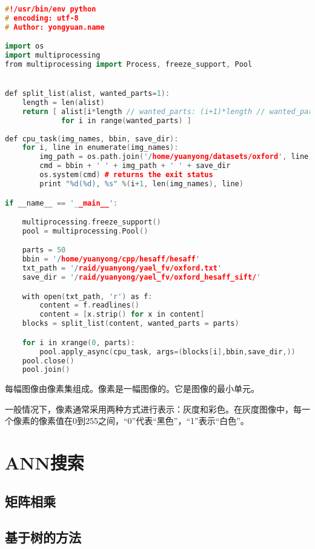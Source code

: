 \documentclass[color=cyan,mathpazo,titlestyle=hang]{elegantbook}
\begin{document}
\begin{lstlisting}[language=c++]
#!/usr/bin/env python
# encoding: utf-8
# Author: yongyuan.name

import os
import multiprocessing
from multiprocessing import Process, freeze_support, Pool


def split_list(alist, wanted_parts=1):
    length = len(alist)
    return [ alist[i*length // wanted_parts: (i+1)*length // wanted_parts]
             for i in range(wanted_parts) ]
             
def cpu_task(img_names, bbin, save_dir):
    for i, line in enumerate(img_names):
        img_path = os.path.join('/home/yuanyong/datasets/oxford', line)
        cmd = bbin + ' ' + img_path + ' ' + save_dir
        os.system(cmd) # returns the exit status
        print "%d(%d), %s" %(i+1, len(img_names), line)

if __name__ == '__main__':

    multiprocessing.freeze_support()
    pool = multiprocessing.Pool()

    parts = 50
    bbin = '/home/yuanyong/cpp/hesaff/hesaff'
    txt_path = '/raid/yuanyong/yael_fv/oxford.txt'
    save_dir = '/raid/yuanyong/yael_fv/oxford_hesaff_sift/'

    with open(txt_path, 'r') as f:
        content = f.readlines()
        content = [x.strip() for x in content]
    blocks = split_list(content, wanted_parts = parts)

    for i in xrange(0, parts):
        pool.apply_async(cpu_task, args=(blocks[i],bbin,save_dir,))
    pool.close()
    pool.join()
\end{lstlisting}

每幅图像由像素集组成。像素是一幅图像的{\color{red}{原材料，积木}}。它是图像的最小单元。

一般情况下，像素通常采用两种方式进行表示：灰度和彩色。在灰度图像中，每一个像素的像素值在0到255之间，“0”代表“黑色”，“1”表示“白色”。

\chapter{ANN搜索}

\section{矩阵相乘}

\section{基于树的方法}
\end{document}
